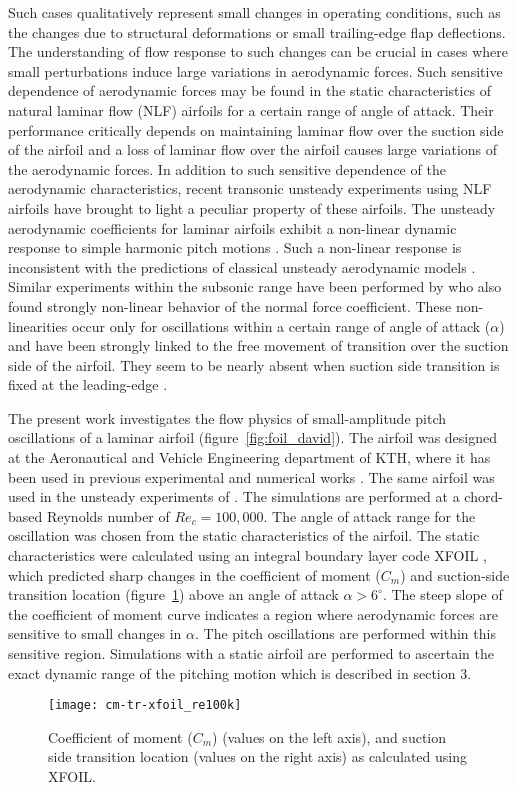 Such cases qualitatively represent small changes in operating conditions, such as the changes due to structural deformations or small trailing-edge flap deflections. The understanding of flow response to such changes can be crucial in cases where small perturbations induce large variations in aerodynamic forces. Such sensitive dependence of aerodynamic forces may be found in the static characteristics of natural laminar flow (NLF) airfoils for a certain range of angle of attack. Their performance critically depends on maintaining laminar flow over the suction side of the airfoil and a loss of laminar flow over the airfoil causes large variations of the aerodynamic forces. In addition to such sensitive dependence of the aerodynamic characteristics, recent transonic unsteady experiments using NLF airfoils have brought to light a peculiar property of these airfoils. The unsteady aerodynamic coefficients for laminar airfoils exhibit a non-linear dynamic response to simple harmonic pitch motions \citep{mai11,hebler13}. Such a non-linear response is inconsistent with the predictions of classical unsteady aerodynamic models \citep{theodorsen35}. Similar experiments within the subsonic range have been performed by \cite{lokattthesis} who also found strongly non-linear behavior of the normal force coefficient. These non-linearities occur only for oscillations within a certain range of angle of attack ($\alpha$) and have been strongly linked to the free movement of transition over the suction side of the airfoil. They seem to be nearly absent when suction side transition is fixed at the leading-edge \citep{mai11,lokattthesis}. 

The present work investigates the flow physics of small-amplitude pitch oscillations of a laminar airfoil (figure~\ref{fig:foil_david}). The airfoil was designed at the Aeronautical and Vehicle Engineering department of KTH, where it has been used in previous experimental and numerical works \citep{lokatt17}. The same airfoil was used in the unsteady experiments of \cite{lokattthesis}. The simulations are performed at a chord-based Reynolds number of $Re_{c}=100,000$. The angle of attack range for the oscillation was chosen from the static characteristics of the airfoil. The static characteristics were calculated using an integral boundary layer code XFOIL \citep{drela89}, which predicted sharp changes in the coefficient of moment ($C_{m}$) and suction-side transition location (figure~\ref{fig:xfoil_cm}) above an angle of attack $\alpha>6^{\circ}$. The steep slope of the coefficient of moment curve indicates a region where aerodynamic forces are sensitive to small changes in $\alpha$. The pitch oscillations are performed within this sensitive region. Simulations with a static airfoil are performed to ascertain the exact dynamic range of the pitching motion which is described in section 3.
\begin{figure}[h]
	\centering
	\texttt{[image: cm-tr-xfoil\_re100k]}
	\caption{Coefficient of moment ($C_{m}$) (values on the left axis), and suction side transition location (values on the right axis) as calculated using XFOIL.}
	\label{fig:xfoil_cm}
\end{figure}

